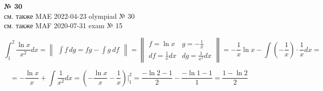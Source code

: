\documentclass{article}
\begin{document}
\textbf{№ 30} 
\\
см. также {\color{red}MAE} 2022-04-23 olympiad № 30 \\
см. также {\color{blue}MAF} 2020-07-31 exam № 15

$$ \int_{1}^{2} \frac{\ln{x}}{x^2} dx 
= \begin{Vmatrix} \int f \,dg = fg - \int g \ df \end{Vmatrix} 
= \begin{Vmatrix} f = \ln{x} &  g = -\frac{1}{x} \\
                 df = \frac{1}{x}dx  & dg = \frac{1}{x^2} dx \end{Vmatrix} 
= -\frac{1}{x} \ln{x} - \int \left( -\frac{1}{x} \right) \cdot \frac{1}{x} dx 
= $$

$$ = -\frac{\ln{x}}{x} + \int\frac{1}{x^2} dx 
= \left( -\frac{\ln{x}}{x} - \frac{1}{x} \right) \bigg\vert_{1}^{2} 
= \frac{-\ln{2}-1}{2} - \frac{-\ln{1}-1}{1}
= \frac{1-\ln{2}}{2}$$
\end{document}
